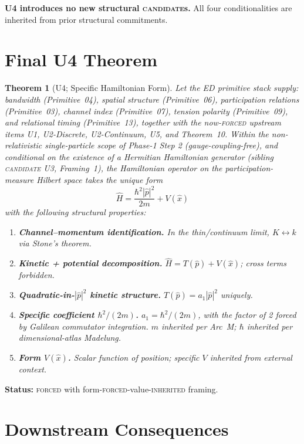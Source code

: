 \documentclass[11pt,a4paper]{article}
\newtheorem{theorem}{Theorem}[section]
\begin{document}
\textbf{U4 introduces no new structural \textsc{candidate}s.} All four conditionalities are inherited from prior structural commitments.

\section{Final U4 Theorem}\label{sec:final-theorem}

\begin{theorem}[U4; Specific Hamiltonian Form]
Let the ED primitive stack supply: bandwidth (Primitive~04), spatial structure (Primitive~06), participation relations (Primitive~03), channel index (Primitive~07), tension polarity (Primitive~09), and relational timing (Primitive~13), together with the now-\textsc{forced} upstream items U1, U2-Discrete, U2-Continuum, U5, and Theorem~10. Within the non-relativistic single-particle scope of Phase-1 Step 2 (gauge-coupling-free), and conditional on the existence of a Hermitian Hamiltonian generator (sibling \textsc{candidate} U3, Framing~1), the Hamiltonian operator on the participation-measure Hilbert space takes the unique form
\[
\hat{H} = \frac{\hbar^2 |\hat{p}|^2}{2m} + V(\hat{x})
\]
with the following structural properties:
\begin{enumerate}
  \item \textbf{Channel--momentum identification.} In the thin/continuum limit, $K \leftrightarrow k$ via Stone's theorem.
  \item \textbf{Kinetic + potential decomposition.} $\hat{H} = T(\hat{p}) + V(\hat{x})$; cross terms forbidden.
  \item \textbf{Quadratic-in-$|\hat{p}|^2$ kinetic structure.} $T(\hat{p}) = a_1 |\hat{p}|^2$ uniquely.
  \item \textbf{Specific coefficient $\hbar^2/(2m)$.} $a_1 = \hbar^2/(2m)$, with the factor of 2 forced by Galilean commutator integration. $m$ inherited per Arc~M; $\hbar$ inherited per dimensional-atlas Madelung.
  \item \textbf{Form $V(\hat{x})$.} Scalar function of position; specific $V$ inherited from external context.
\end{enumerate}
\end{theorem}

\textbf{Status:} \textsc{forced} with form-\textsc{forced}-value-\textsc{inherited} framing.

\section{Downstream Consequences}\label{sec:downstream}
\end{document}
